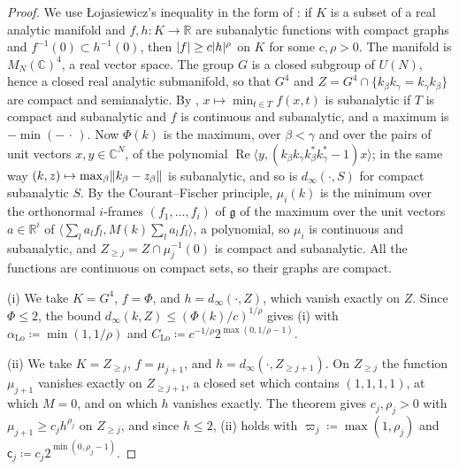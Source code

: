 \documentclass[11pt]{preprint}
\DeclarePairedDelimiter{\abs}{\lvert}{\rvert}
\DeclarePairedDelimiter{\norm}{\lVert}{\rVert}
\numberwithin{equation}{section}
\theoremstyle{definition}
\theoremstyle{remark}
\theoremstyle{plain}
\begin{document}
\begin{proof}
We use {\L}ojasiewicz's inequality in the form of \cite[Theorem~6.4, p.~34]{BierstoneMilman}: if $K$ is a subset of a real analytic manifold and $f, h \colon K \to \mathbb R$ are subanalytic functions with compact graphs and $f^{-1}(0) \subset h^{-1}(0)$, then $\abs{f} \geq c\abs h^\rho$ on $K$ for some $c, \rho > 0$. The manifold is $M_N(\mathbb C)^4$, a real vector space. The group $G$ is a closed subgroup of $U(N)$, hence a closed real analytic submanifold, so that $G^4$ and $Z = G^4 \cap \{ k_\beta k_\gamma = k_\gamma k_\beta \}$ are compact and semianalytic. By \cite[Remarks~3.11(2), p.~19]{BierstoneMilman}, $x \mapsto \min_{t \in T}f(x, t)$ is subanalytic if $T$ is compact and subanalytic and $f$ is continuous and subanalytic, and a maximum is $-\min(-\,\cdot\,)$. Now $\Phi(k)$ is the maximum, over $\beta < \gamma$ and over the pairs of unit vectors $x, y \in \mathbb C^N$, of the polynomial $\operatorname{Re}\langle y, (k_\beta k_\gamma k_\beta^*k_\gamma^* - 1)x\rangle$; in the same way $(k, z) \mapsto \max_\beta\norm{k_\beta - z_\beta}$ is subanalytic, and so is $d_\infty(\cdot, S)$ for compact subanalytic $S$. By the Courant--Fischer principle, $\mu_i(k)$ is the minimum over the orthonormal $i$-frames $(f_1, \dots, f_i)$ of $\mathfrak g$ of the maximum over the unit vectors $a \in \mathbb R^i$ of $\langle\sum_la_lf_l, M(k)\sum_la_lf_l\rangle$, a polynomial, so $\mu_i$ is continuous and subanalytic, and $Z_{\geq j} = Z \cap \mu_j^{-1}(0)$ is compact and subanalytic. All the functions are continuous on compact sets, so their graphs are compact.

(i) We take $K = G^4$, $f = \Phi$, and $h = d_\infty(\cdot, Z)$, which vanish exactly on $Z$. Since $\Phi \leq 2$, the bound $d_\infty(k, Z) \leq (\Phi(k)/c)^{1/\rho}$ gives (i) with $\alpha_{\mathrm{Lo}} \coloneqq \min(1, 1/\rho)$ and $C_{\mathrm{Lo}} \coloneqq c^{-1/\rho}2^{\max(0, 1/\rho - 1)}$.

(ii) We take $K = Z_{\geq j}$, $f = \mu_{j+1}$, and $h = d_\infty(\cdot, Z_{\geq j+1})$. On $Z_{\geq j}$ the function $\mu_{j+1}$ vanishes exactly on $Z_{\geq j+1}$, a closed set which contains $(1, 1, 1, 1)$, at which $M = 0$, and on which $h$ vanishes exactly. The theorem gives $c_j, \rho_j > 0$ with $\mu_{j+1} \geq c_jh^{\rho_j}$ on $Z_{\geq j}$, and since $h \leq 2$, (ii) holds with $\varpi_j \coloneqq \max(1, \rho_j)$ and $\mathsf c_j \coloneqq c_j2^{\min(0, \rho_j - 1)}$.
\end{proof}
\end{document}
